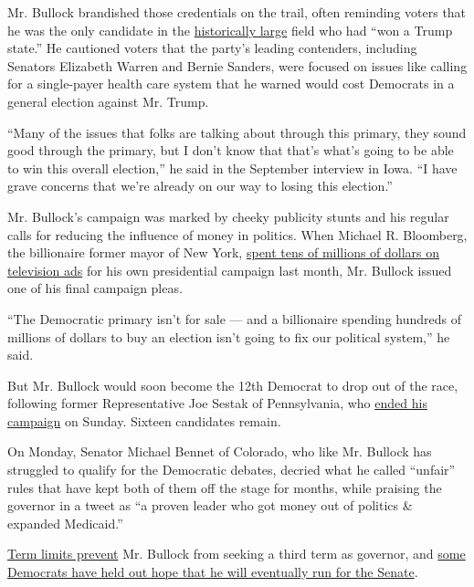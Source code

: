 Mr. Bullock brandished those credentials on the trail, often reminding
voters that he was the only candidate in the
\href{https://www.nytimes.com/interactive/2019/02/14/us/politics/2020-democratic-candidates-president.html}{historically
large} field who had ``won a Trump state.'' He cautioned voters that the
party's leading contenders, including Senators Elizabeth Warren and
Bernie Sanders, were focused on issues like calling for a single-payer
health care system that he warned would cost Democrats in a general
election against Mr. Trump.

``Many of the issues that folks are talking about through this primary,
they sound good through the primary, but I don't know that that's what's
going to be able to win this overall election,'' he said in the
September interview in Iowa. ``I have grave concerns that we're already
on our way to losing this election.''

Mr. Bullock's campaign was marked by cheeky publicity stunts and his
regular calls for reducing the influence of money in politics. When
Michael R. Bloomberg, the billionaire former mayor of New York,
\href{https://www.nytimes.com/2019/11/22/us/politics/bloomberg-ads-2020-race.html}{spent
tens of millions of dollars on television ads} for his own presidential
campaign last month, Mr. Bullock issued one of his final campaign pleas.

``The Democratic primary isn't for sale --- and a billionaire spending
hundreds of millions of dollars to buy an election isn't going to fix
our political system,'' he said.

But Mr. Bullock would soon become the 12th Democrat to drop out of the
race, following former Representative Joe Sestak of Pennsylvania, who
\href{https://www.nytimes.com/2019/12/01/us/politics/joe-sestak-ends-presidential-campaign.html}{ended
his campaign} on Sunday. Sixteen candidates remain.

On Monday, Senator Michael Bennet of Colorado, who like Mr. Bullock has
struggled to qualify for the Democratic debates, decried what he called
``unfair'' rules that have kept both of them off the stage for months,
while praising the governor in a tweet as ``a proven leader who got
money out of politics \& expanded Medicaid.''

\href{https://sosmt.gov/elections/term_limits/}{Term limits prevent} Mr.
Bullock from seeking a third term as governor, and
\href{https://www.politico.com/story/2019/05/14/steve-bullock-senate-2020-1321058}{some
Democrats have held out hope that he will eventually run for the
Senate}.

